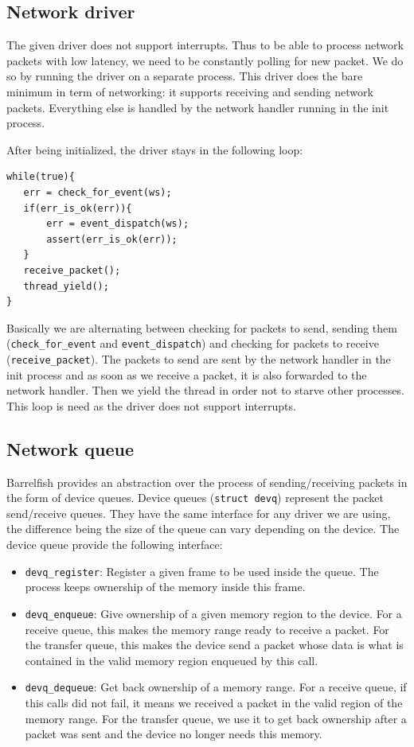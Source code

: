 \subsection{Network driver}

The given driver does not support interrupts. Thus to be able to process network packets with low latency, we need to be constantly polling for new packet. We do so by running the driver on a separate process. This driver does the bare minimum in term of networking: it supports receiving and sending network packets. Everything else is handled by the network handler running in the init process.
\medskip

After being initialized, the driver stays in the following loop:
\begin{lstlisting}
while(true){
   err = check_for_event(ws);
   if(err_is_ok(err)){
       err = event_dispatch(ws);
       assert(err_is_ok(err));
   }
   receive_packet();
   thread_yield();
}
\end{lstlisting}
Basically we are alternating between checking for packets to send, sending them (\verb|check_for_event| and \verb|event_dispatch|) and checking for packets to receive (\verb|receive_packet|). The packets to send are sent by the network handler in the init process and as soon as we receive a packet, it is also forwarded to the network handler. Then we yield the thread in order not to starve other processes. This loop is need as the driver does not support interrupts.

\subsection{Network queue}

Barrelfish provides an abstraction over the process of sending/receiving packets in the form of device queues. Device queues (\verb|struct devq|) represent the packet send/receive queues. They have the same interface for any driver we are using, the difference being the size of the queue can vary depending on the device. The device queue provide the following interface:

\begin{itemize}
\item \verb|devq_register|: Register a given frame to be used inside the queue. The process keeps ownership of the memory inside this frame.
\item \verb|devq_enqueue|: Give ownership of a given memory region to the device. For a receive queue, this makes the memory range ready to receive a packet. For the transfer queue, this makes the device send a packet whose data is what is contained in the valid memory region enqueued by this call.
\item \verb|devq_dequeue|: Get back ownership of a memory range. For a receive queue, if this calls did not fail, it means we received a packet in the valid region of the memory range. For the transfer queue, we use it to get back ownership after a packet was sent and the device no longer needs this memory.
\end{itemize}

